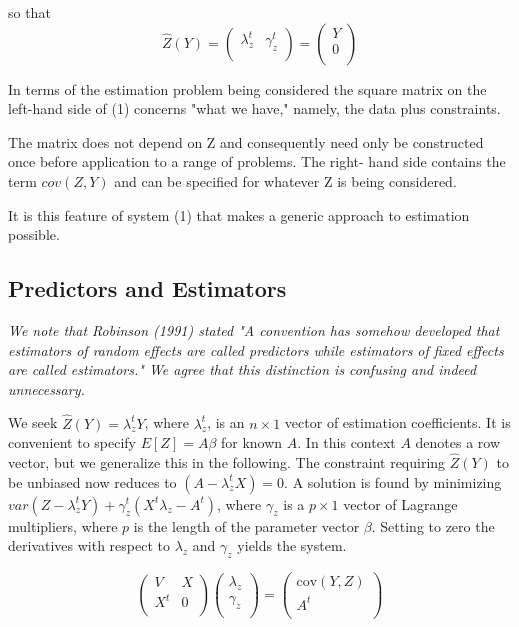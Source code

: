 \documentclass[12pt, a4paper]{article}
\begin{document}
so that
\[ \hat{Z}(Y) =
\left(
\begin{array}{cc}
\lambda_{z}^{t}&
\gamma_z^{t} \\
\end{array}
\right)=\left(
\begin{array}{c}
Y \\
0 \\
\end{array}
\right) \]

In terms of the estimation problem being considered the square matrix on the left-hand side of (1) concerns "what we have," namely, the data plus constraints.

The matrix does not depend on Z and consequently need only be constructed once before application to a range of problems. The right- hand side contains the term $cov(Z,Y)$ and can be specified for whatever Z is being considered.

It is this feature of system (1) that makes a generic approach to estimation possible.
\subsection{Predictors and Estimators}

\emph{We note that Robinson (1991) stated "A convention has somehow developed that estimators of random effects are called predictors while estimators of fixed effects are called estimators." We agree that this distinction is confusing and indeed unnecessary.} \\ \bigskip



We seek $\hat{Z}(Y) = \lambda_{z}^{t}Y$, where $ \lambda_{z}^{t}$, is an $n \times 1$ vector of estimation coefficients. It is convenient to specify $E[Z]=A\beta$ for known $A$. In this context $A$ denotes a row vector, but we generalize this in the following. The constraint requiring $\hat{Z}(Y)$ to be unbiased now reduces to $(A -  \lambda_{z}^{t}X) = 0$. A solution is found by minimizing $var(Z -  \lambda_{z}^{t}Y) + \gamma^t_z (X^t\lambda_{z} - A^t)$, where $\gamma_z$ is a $p \times 1$ vector of Lagrange multipliers, where $p$ is the length of the parameter vector $\beta$. Setting to zero the derivatives with respect to $\lambda_{z}$ and $\gamma_z $ yields the system.




\begin{equation}
\left(
\begin{array}{cc}
V & X \\
X^t & 0 \\
\end{array}
\right)\left(
\begin{array}{c}
\lambda_{z}\\
\gamma_z \\
\end{array}
\right)=\left(
\begin{array}{c}
\mbox{cov}(Y,Z)\\
A^{t} \\
\end{array}
\right)
\end{equation}
\end{document}
